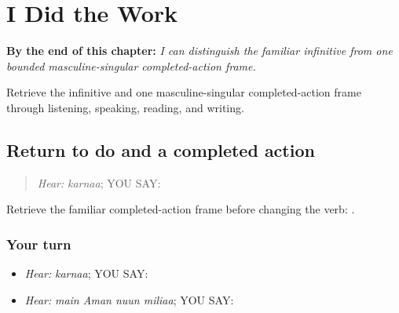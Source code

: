 
\chapter{I Did the Work}
\label{ch:pa-a2-kita-perfective}

\begin{chapteropening}
\textbf{By the end of this chapter:} \emph{I can distinguish the familiar infinitive from one bounded masculine-singular completed-action frame.}

Retrieve the infinitive and one masculine-singular completed-action frame through listening, speaking, reading, and writing.
\end{chapteropening}

\section[\texorpdfstring{\pa{ਕਰਨਾ} · \pa{ਮੈਂ} \pa{ਅਮਨ} \pa{ਨੂੰ} … (karnaa; main …)}{ਕਰਨਾ · ਮੈਂ ਅਮਨ ਨੂੰ … (karnaa; main …)}]{Return to do and a completed action}

\label{lesson:PA-C190-karna-return}



\begin{quote}
\emph{Hear:} \emph{karnaa}; YOU SAY: \textbf{}
\end{quote}

\begin{grammarlens}[title={Grammar Lens}]
Retrieve the familiar completed-action frame before changing the verb: \textbf{   }.
\end{grammarlens}

\subsection*{Your turn}
\begin{itemize}
\raggedright
  \item \emph{Hear:} \emph{karnaa}; YOU SAY: \textbf{}
  \item \emph{Hear:} \emph{main Aman nuun miliaa}; YOU SAY: \textbf{   }
\end{itemize}

